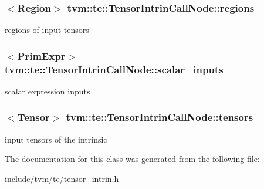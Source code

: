 \subsubsection[{\texorpdfstring{regions}{regions}}]{$<${\bf Region}$>$ tvm\+::te\+::\+Tensor\+Intrin\+Call\+Node\+::regions}\hypertarget{classtvm_1_1te_1_1TensorIntrinCallNode_a4c934a6d85bf27b3263ad0d79fb17144}{}\label{classtvm_1_1te_1_1TensorIntrinCallNode_a4c934a6d85bf27b3263ad0d79fb17144}


regions of input tensors 

\subsubsection[{\texorpdfstring{scalar\+\_\+inputs}{scalar_inputs}}]{$<${\bf Prim\+Expr}$>$ tvm\+::te\+::\+Tensor\+Intrin\+Call\+Node\+::scalar\+\_\+inputs}\hypertarget{classtvm_1_1te_1_1TensorIntrinCallNode_a862c22c7362a799b0f44de41920bffc8}{}\label{classtvm_1_1te_1_1TensorIntrinCallNode_a862c22c7362a799b0f44de41920bffc8}


scalar expression inputs 

\subsubsection[{\texorpdfstring{tensors}{tensors}}]{$<${\bf Tensor}$>$ tvm\+::te\+::\+Tensor\+Intrin\+Call\+Node\+::tensors}\hypertarget{classtvm_1_1te_1_1TensorIntrinCallNode_a92b543750ea55b9cfd6852139e2ddbd6}{}\label{classtvm_1_1te_1_1TensorIntrinCallNode_a92b543750ea55b9cfd6852139e2ddbd6}


input tensors of the intrinsic 



The documentation for this class was generated from the following file\+:\begin{DoxyCompactItemize}
\item 
include/tvm/te/\hyperlink{tensor__intrin_8h}{tensor\+\_\+intrin.\+h}\end{DoxyCompactItemize}
